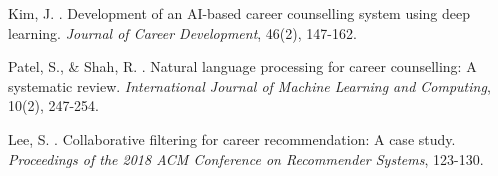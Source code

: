 \documentclass[12pt,a4paper]{article}
\begin{document}

\begin{thebibliography}{99}

Kim, J. . Development of an AI-based career counselling system using deep learning. \emph{Journal of Career Development}, 46(2), 147-162.

Patel, S., \& Shah, R. . Natural language processing for career counselling: A systematic review. \emph{International Journal of Machine Learning and Computing}, 10(2), 247-254.

Lee, S. . Collaborative filtering for career recommendation: A case study. \emph{Proceedings of the 2018 ACM Conference on Recommender Systems}, 123-130.

\end{thebibliography}
\end{document}
